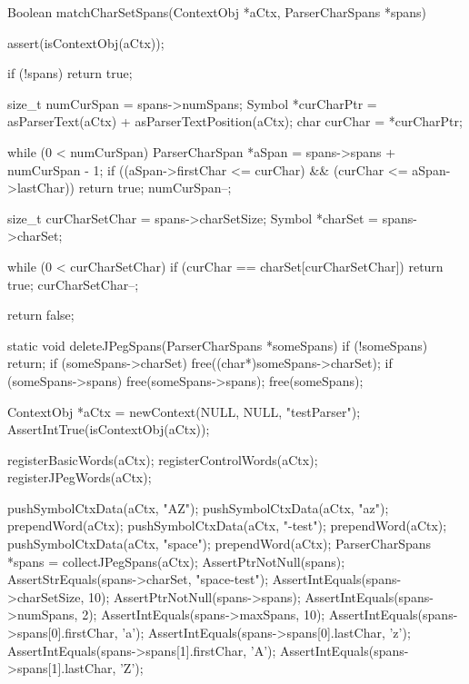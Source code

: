 \startCCode
Boolean matchCharSetSpans(ContextObj *aCtx, ParserCharSpans *spans) {
  assert(isContextObj(aCtx));
  
  if (!spans) return true;
  
  size_t numCurSpan  = spans->numSpans;
  Symbol *curCharPtr = asParserText(aCtx) + asParserTextPosition(aCtx);
  char curChar       = *curCharPtr;
  
  while (0 < numCurSpan) {
    ParserCharSpan *aSpan = spans->spans + numCurSpan - 1;
    if ((aSpan->firstChar <= curChar) && (curChar <= aSpan->lastChar)) {
      return true;
    } 
    numCurSpan--;
  }
  
  size_t curCharSetChar = spans->charSetSize;
  Symbol *charSet       = spans->charSet;
  
  while (0 < curCharSetChar) {
    if (curChar == charSet[curCharSetChar]) {
      return true;
    }
    curCharSetChar--;
  }
  
  return false;
}

static void deleteJPegSpans(ParserCharSpans *someSpans) {
  if (!someSpans) return;
  if (someSpans->charSet) free((char*)someSpans->charSet);
  if (someSpans->spans)   free(someSpans->spans);
  free(someSpans);
}
\stopCCode


\startCTest
  ContextObj *aCtx = newContext(NULL, NULL, "testParser");
  AssertIntTrue(isContextObj(aCtx));
  
  registerBasicWords(aCtx);
  registerControlWords(aCtx);
  registerJPegWords(aCtx);
  
  pushSymbolCtxData(aCtx, "AZ");
  pushSymbolCtxData(aCtx, "az");
  prependWord(aCtx);
  pushSymbolCtxData(aCtx, "-test");
  prependWord(aCtx);
  pushSymbolCtxData(aCtx, "space");
  prependWord(aCtx);
  ParserCharSpans *spans = collectJPegSpans(aCtx);
  AssertPtrNotNull(spans);
  AssertStrEquals(spans->charSet, "space-test");
  AssertIntEquals(spans->charSetSize, 10);
  AssertPtrNotNull(spans->spans);
  AssertIntEquals(spans->numSpans, 2);
  AssertIntEquals(spans->maxSpans, 10);
  AssertIntEquals(spans->spans[0].firstChar, 'a');
  AssertIntEquals(spans->spans[0].lastChar,  'z');
  AssertIntEquals(spans->spans[1].firstChar, 'A');
  AssertIntEquals(spans->spans[1].lastChar,  'Z');
  
